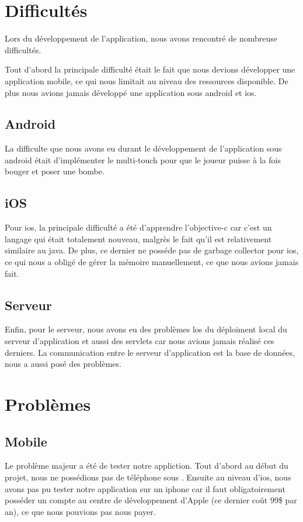\section{Difficultés}
	Lors du développement de l'application, nous avons rencontré de nombreuse difficultés.
	
	Tout d'abord la principale difficulté était le fait que nous devions développer une application mobile, ce qui nous limitait au niveau des ressources disponible. De plus nous avions jamais développé une application sous \gls{android} et \gls{ios}.
	
	\subsection{Android}
		La difficulte que nous avons eu durant le développement de l'application sous \gls{android} était d'implémenter le multi-touch pour que le joueur puisse à la fois bouger et poser une bombe.
	
	\subsection{iOS}
		Pour \gls{ios}, la principale difficulté a été d'apprendre l'\gls{objective-c} car c'est un langage qui était totalement nouveau, malgrès le fait qu'il est relativement similaire au \gls{java}. De plus, ce dernier ne posséde pas de garbage collector pour \gls{ios}, ce qui nous a obligé de gérer la mémoire manuellement, ce que nous avions jamais fait.
	
	\subsection{Serveur}
		Enfin, pour le serveur, nous avons eu des problèmes los du déploiment local du serveur d'application et aussi des servlets car nous avions jamais réalisé ces derniers. La communication entre le serveur d'application est la base de données, nous a aussi posé des problèmes.


\section{Problèmes}
	
	\subsection{Mobile}
		Le problème majeur a été de tester notre appliction. Tout d'abord au début du projet, nous ne possédions pas de téléphone sous . Ensuite au niveau d'\gls{ios}, nous avons pas pu tester notre application sur un \gls{iphone} car il faut obligatoirement posséder un compte au centre de développement d'Apple (ce dernier coût 99\$ par an), ce que nous pouvions pas nous payer.
		
